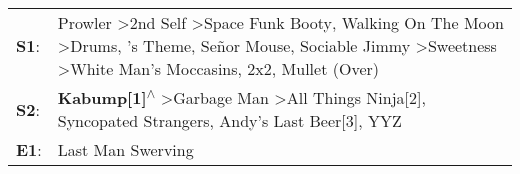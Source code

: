 \begin{supertabular}{p{0.03\textwidth}p{0.92\textwidth}}
 \textbf{S1}:  &  Prowler\textsuperscript{} \textgreater \enspace 2nd Self\textsuperscript{} \textgreater \enspace Space Funk Booty\textsuperscript{}, \enspace Walking On The Moon\textsuperscript{} \textgreater \enspace Drums\textsuperscript{}, 's Theme\textsuperscript{}, \enspace Señor Mouse\textsuperscript{}, \enspace Sociable Jimmy\textsuperscript{} \textgreater \enspace Sweetness\textsuperscript{} \textgreater \enspace White Man's Moccasins\textsuperscript{}, \enspace 2x2\textsuperscript{}, \enspace Mullet (Over)\textsuperscript{}  \enspace  \\
 \textbf{S2}:  &                                                                                                                                                                                                                                                          \textbf{Kabump[1]\textsuperscript{$\wedge$}} \textgreater \enspace Garbage Man\textsuperscript{} \textgreater \enspace All Things Ninja[2]\textsuperscript{}, \enspace Syncopated Strangers\textsuperscript{}, \enspace Andy's Last Beer[3]\textsuperscript{}, \enspace YYZ\textsuperscript{}  \enspace  \\
 \textbf{E1}:  &                                                                                                                                                                                                                                                                                                                                                                                                                                                                                                                    Last Man Swerving\textsuperscript{}  \enspace  \\
\end{supertabular}
